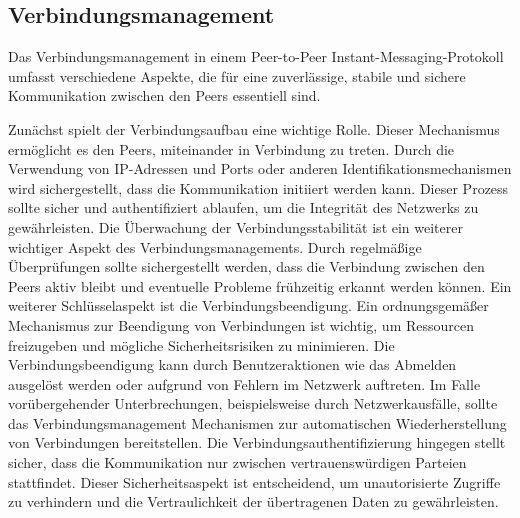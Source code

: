 \subsection{Verbindungsmanagement}
\label{subsec:verbindungsmanagement_req}

Das Verbindungsmanagement in einem Peer-to-Peer Instant-Messaging-Protokoll umfasst verschiedene Aspekte, die für eine zuverlässige, stabile und sichere Kommunikation zwischen den Peers essentiell sind.

Zunächst spielt der Verbindungsaufbau eine wichtige Rolle. Dieser Mechanismus ermöglicht es den Peers, miteinander in Verbindung zu treten. Durch die Verwendung von IP-Adressen und Ports oder anderen Identifikationsmechanismen wird sichergestellt, dass die Kommunikation initiiert werden kann. Dieser Prozess sollte sicher und authentifiziert ablaufen, um die Integrität des Netzwerks zu gewährleisten. Die Überwachung der Verbindungsstabilität ist ein weiterer wichtiger Aspekt des Verbindungsmanagements. Durch regelmäßige Überprüfungen sollte sichergestellt werden, dass die Verbindung zwischen den Peers aktiv bleibt und eventuelle Probleme frühzeitig erkannt werden können. Ein weiterer Schlüsselaspekt ist die Verbindungsbeendigung. Ein ordnungsgemäßer Mechanismus zur Beendigung von Verbindungen ist wichtig, um Ressourcen freizugeben und mögliche Sicherheitsrisiken zu minimieren. Die Verbindungsbeendigung kann durch Benutzeraktionen wie das Abmelden ausgelöst werden oder aufgrund von Fehlern im Netzwerk auftreten. Im Falle vorübergehender Unterbrechungen, beispielsweise durch Netzwerkausfälle, sollte das Verbindungsmanagement Mechanismen zur automatischen Wiederherstellung von Verbindungen bereitstellen. Die Verbindungsauthentifizierung hingegen stellt sicher, dass die Kommunikation nur zwischen vertrauenswürdigen Parteien stattfindet. Dieser Sicherheitsaspekt ist entscheidend, um unautorisierte Zugriffe zu verhindern und die Vertraulichkeit der übertragenen Daten zu gewährleisten.